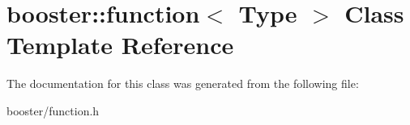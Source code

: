 \section{booster\-:\-:function$<$ Type $>$ Class Template Reference}
\label{classbooster_1_1function}


The documentation for this class was generated from the following file\-:\begin{DoxyCompactItemize}
\item 
booster/function.\-h\end{DoxyCompactItemize}
